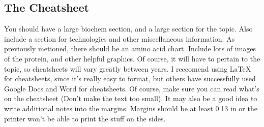 \documentclass[twocolumn]{article}
\begin{document}
\subsection{The Cheatsheet}
You should have a large biochem section, and a large section for the topic. Also include a section for technologies and other miscellaneous information. As previously metioned, there should be an amino acid chart. Include lots of images of the protein, and other helpful graphics. Of course, it will have to pertain to the topic, so cheatsheets will vary greatly between years. I reccomend using \LaTeX{} for cheatsheets, since it's really easy to format, but others have successfully used Google Docs and Word for cheatsheets. Of course, make sure you can read what's on the cheatsheet (Don't make the text too small). It may also be a good idea to write additional notes into the margins. Margins should be at least 0.13 in or the printer won't be able to print the stuff on the sides. 
\end{document}
